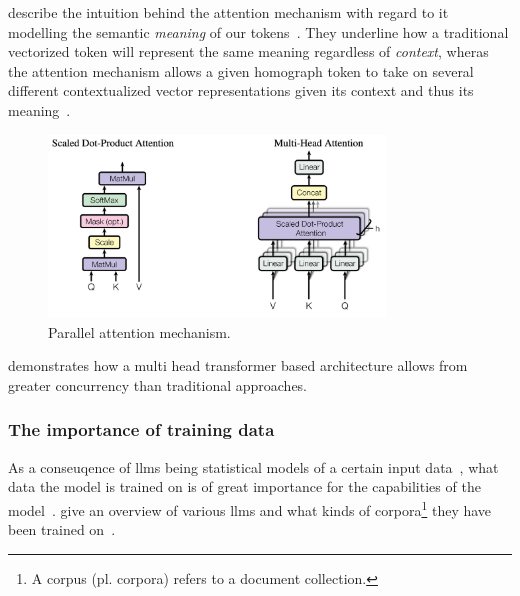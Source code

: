 \citeauthor{jm} describe the intuition behind the attention mechanism with
regard to it modelling the semantic \textit{meaning} of our
tokens~\cite[185]{jm}. They underline how a traditional vectorized token will
represent the same meaning regardless of \textit{context}, wheras the attention
mechanism allows a given homograph token to take on several different
contextualized vector representations given its context and thus its
meaning~\cite[185-186]{jm}.



\begin{figure}[h]
    \centering
    \includegraphics[width=0.8\textwidth]{media/attentionArches.png}
    \caption[Parallel attention mechanism]{Parallel attention mechanism.\footnotemark}\label{fig:paraAttention}
\end{figure}


 demonstrates how a multi head transformer based architecture
allows from greater concurrency than traditional approaches.

%

\subsubsection{The importance of training data}

As a conseuqence of \acrshort{llms} being statistical models of a certain input
data~\cite[1]{llmSurvey}, what data the model is trained on is of great
importance for the capabilities of the model~\cite[6]{llmSurvey}.
\citeauthor{llmSurvey} give an overview of various \acrshort{llms} and what
kinds of corpora\footnote{A corpus (pl. corpora) refers to a document
    collection.} they have been trained on~\cite[11-14]{llmSurvey}.


